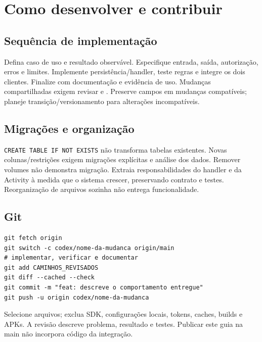 \documentclass[11pt,a4paper]{article}
\newcommand{\arquivo}[1]{\path{#1}}
\begin{document}
\section{Como desenvolver e contribuir}
\subsection{Sequência de implementação}
Defina caso de uso e resultado observável. Especifique entrada, saída, autorização, erros e limites. Implemente persistência/handler, teste regras e integre os dois clientes. Finalize com documentação e evidência de uso.
Mudanças compartilhadas exigem revisar \arquivo{api.js} e \arquivo{ClienteApi.kt}. Preserve campos em mudanças compatíveis; planeje transição/versionamento para alterações incompatíveis.
\subsection{Migrações e organização}
\texttt{CREATE TABLE IF NOT EXISTS} não transforma tabelas existentes. Novas colunas/restrições exigem migrações explícitas e análise dos dados. Remover volumes não demonstra migração.
Extraia responsabilidades do handler e da Activity à medida que o sistema crescer, preservando contrato e testes. Reorganização de arquivos sozinha não entrega funcionalidade.
\subsection{Git}
\begin{lstlisting}
git fetch origin
git switch -c codex/nome-da-mudanca origin/main
# implementar, verificar e documentar
git add CAMINHOS_REVISADOS
git diff --cached --check
git commit -m "feat: descreve o comportamento entregue"
git push -u origin codex/nome-da-mudanca
\end{lstlisting}
Selecione arquivos; exclua SDK, configurações locais, tokens, caches, builds e APKs. A revisão descreve problema, resultado e testes. Publicar este guia na main não incorpora código da integração.
\end{document}
